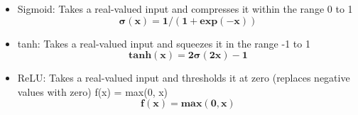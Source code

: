 \begin{itemize}
\item Sigmoid:
Takes a real-valued input and compresses it within the range 0 to 1
\begin{equation}
\mathbf{\sigma(x) = 1 / (1 + exp(-x))}
\end{equation}

\item tanh:
Takes a real-valued input and squeezes it in the range -1 to 1
\begin{equation}
\mathbf{tanh(x) = 2 \sigma (2x)-1}
\end{equation}

\item ReLU:
Takes a real-valued input and thresholds it at zero (replaces negative values with zero)
f(x) = max(0, x)
\begin{equation}
\mathbf{f(x) = max(0, x)}
\end{equation}
\end{itemize}

